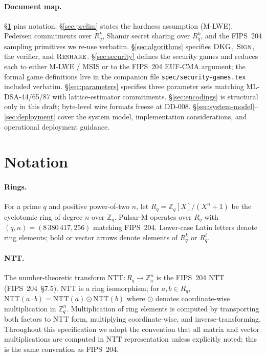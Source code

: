 \documentclass[11pt,a4paper]{article}
\theoremstyle{definition}
\theoremstyle{remark}
\newcommand{\Rq}{R_q}
\newcommand{\Zq}{\mathbb{Z}_q}
\newcommand{\NTT}{\mathrm{NTT}}
\newcommand{\Sign}{\textsc{Sign}}
\newcommand{\DKG}{\textsc{DKG}}
\newcommand{\Reshare}{\textsc{Reshare}}
\begin{document}
\paragraph{Document map.}
\S\ref{sec:notation} pins notation. \S\ref{sec:prelim} states the
hardness assumption (M-LWE), Pedersen commitments over $\Rq^k$,
Shamir secret sharing over $\Rq^k$, and the FIPS~204 sampling
primitives we re-use verbatim. \S\ref{sec:algorithms} specifies
$\DKG$, $\Sign$, the verifier, and $\Reshare$.
\S\ref{sec:security} defines the security games and reduces each to
either M-LWE / MSIS or to the FIPS~204 EUF-CMA argument; the formal
game definitions live in the companion file
\texttt{spec/security-games.tex} included verbatim.
\S\ref{sec:parameters} specifies three parameter sets matching
ML-DSA-44/65/87 with lattice-estimator commitments.
\S\ref{sec:encodings} is structural only in this draft; byte-level
wire formats freeze at DD-008.
\S\ref{sec:system-model}--\ref{sec:deployment} cover the system model,
implementation considerations, and operational deployment guidance.

\section{Notation}
\label{sec:notation}

\paragraph{Rings.} For a prime $q$ and positive power-of-two $n$, let
$\Rq = \Zq[X]/(X^n + 1)$ be the cyclotomic ring of degree $n$ over
$\Zq$. Pulsar-M operates over $\Rq$ with $(q, n) = (8\,380\,417, 256)$
matching FIPS~204. Lower-case Latin letters denote ring elements;
bold or vector arrows denote elements of $\Rq^k$ or $\Rq^\ell$.

\paragraph{NTT.} The number-theoretic transform
$\NTT : \Rq \to \Zq^n$ is the FIPS~204 NTT
(FIPS~204~\S7.5). $\NTT$ is a ring isomorphism; for $a, b \in \Rq$,
$\NTT(a \cdot b) = \NTT(a) \odot \NTT(b)$ where $\odot$ denotes
coordinate-wise multiplication in $\Zq^n$. Multiplication of ring
elements is computed by transporting both factors to NTT form,
multiplying coordinate-wise, and inverse-transforming. Throughout
this specification we adopt the convention that all matrix and
vector multiplications are computed in NTT representation unless
explicitly noted; this is the same convention as FIPS~204.
\end{document}
